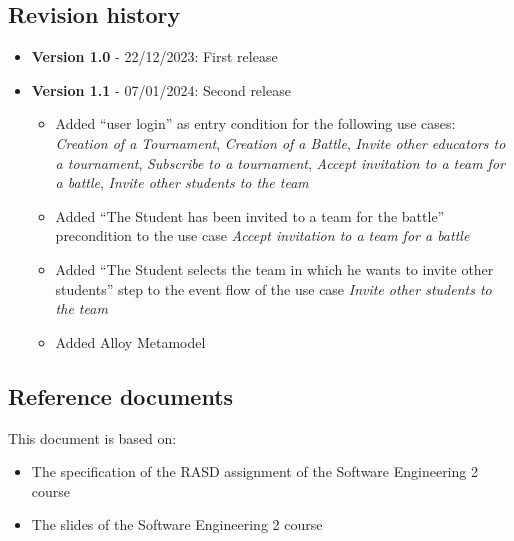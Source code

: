 \subsection{Revision history}
\begin{itemize}
    \item \textbf{Version 1.0} - 22/12/2023: First release
    \item \textbf{Version 1.1}  - 07/01/2024: Second release
        \begin{itemize}
            \item Added ``user login'' as entry condition for the following use cases:
            \textit{Creation of a Tournament}, \textit{Creation of a Battle},
            \textit{Invite other educators to a tournament}, \textit{Subscribe to a tournament},
            \textit{Accept invitation to a team for a battle}, \textit{Invite other students to the team}
            \item Added ``The Student has been invited to a team for the battle'' precondition to the use case \textit{Accept invitation to a team for a battle}
            \item Added ``The Student selects the team in which he wants to invite other students'' step to the event flow of the use case \textit{Invite other students to the team}
            \item Added Alloy Metamodel
        \end{itemize}
\end{itemize}

\subsection{Reference documents}
This document is based on:
\begin{itemize}
    \item The specification of the RASD assignment of the Software Engineering 2 course
    \item The slides of the Software Engineering 2 course
\end{itemize}

